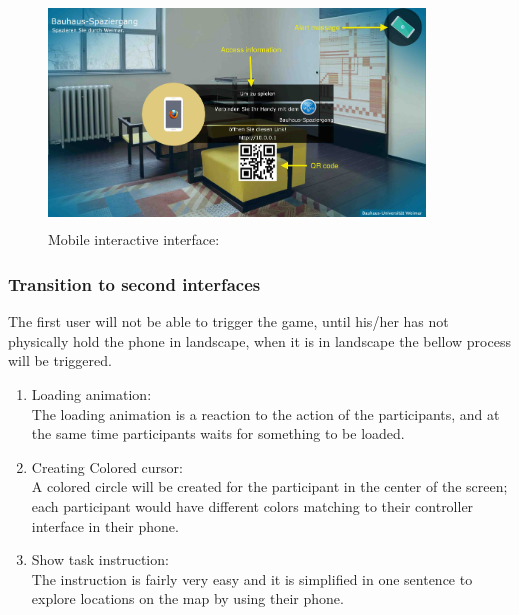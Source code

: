 \begin{figure}[H]
    \centering
    \includegraphics[width=100mm,height=60mm]{Figures/7/mobile_interactive/first_interface}
    \caption{Mobile interactive interface:}%
    \label{fig:mobile_firstinterface}%
\end{figure}



\subsubsection{Transition to second interfaces}
The first user will not be able to trigger the game, until his/her has not physically hold the phone in landscape, when it is in landscape the bellow process will be triggered.

\begin{enumerate}
\item Loading animation:\\
  The loading animation is a reaction to the action of the participants, and at the same time participants waits for something to be loaded.
\item  Creating Colored cursor: \\
A colored circle will be created for the participant in the center of the screen; each participant would have different colors matching to their controller interface in their phone.
\item Show task instruction:  \\
The instruction is fairly very easy and it is simplified in one sentence to explore locations on the map by using their phone.

\end{enumerate}

